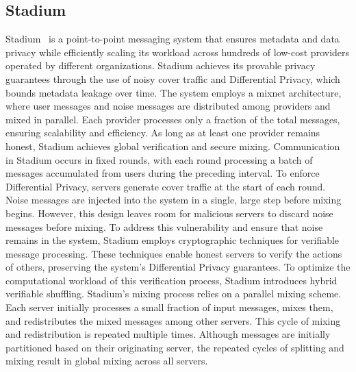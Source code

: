 \subsection{Stadium}\label{sec:stadium}
Stadium~\cite{Stadium} is a point-to-point messaging system that ensures metadata and data privacy while efficiently scaling its workload across hundreds of low-cost providers operated by different organizations. Stadium achieves its provable privacy guarantees through the use of noisy cover traffic and Differential Privacy, which bounds metadata leakage over time.
The system employs a mixnet architecture, where user messages and noise messages are distributed among providers and mixed in parallel. Each provider processes only a fraction of the total messages, ensuring scalability and efficiency. As long as at least one provider remains honest, Stadium achieves global verification and secure mixing. Communication in Stadium occurs in fixed rounds, with each round processing a batch of messages accumulated from users during the preceding interval.
To enforce Differential Privacy, servers generate cover traffic at the start of each round. Noise messages are injected into the system in a single, large step before mixing begins. However, this design leaves room for malicious servers to discard noise messages before mixing. To address this vulnerability and ensure that noise remains in the system, Stadium employs cryptographic techniques for verifiable message processing. These techniques enable honest servers to verify the actions of others, preserving the system's Differential Privacy guarantees. To optimize the computational workload of this verification process, Stadium introduces hybrid verifiable shuffling.
Stadium's mixing process relies on a parallel mixing scheme. Each server initially processes a small fraction of input messages, mixes them, and redistributes the mixed messages among other servers. This cycle of mixing and redistribution is repeated multiple times. Although messages are initially partitioned based on their originating server, the repeated cycles of splitting and mixing result in global mixing across all servers.

